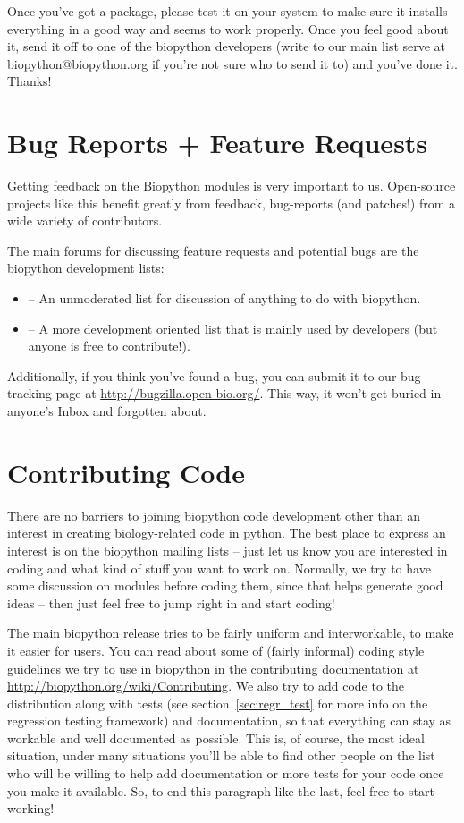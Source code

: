 \documentclass{report}
\begin{document}
Once you've got a package, please test it on your system to make sure it installs everything in a good way and seems to work properly. Once you feel good about it, send it off to one of the biopython developers (write to our main list serve at biopython@biopython.org if you're not sure who to send it to) and you've done it. Thanks!

\section{Bug Reports + Feature Requests}

Getting feedback on the Biopython modules is very important to us. Open-source projects like this benefit greatly from feedback, bug-reports (and patches!) from a wide variety of contributors.

The main forums for discussing feature requests and potential bugs are the biopython development lists:

\begin{itemize}
  \item {} -- An unmoderated list for discussion of anything to do with biopython.

  \item {} -- A more development oriented list that is mainly used by developers (but anyone is free to contribute!).
\end{itemize}

Additionally, if you think you've found a bug, you can submit it to our
bug-tracking page at \url{http://bugzilla.open-bio.org/}. This
way, it won't get buried in anyone's Inbox and forgotten about.

\section{Contributing Code}

There are no barriers to joining biopython code development other than an interest in creating biology-related code in python. The best place to express an interest is on the biopython mailing lists -- just let us know you are interested in coding and what kind of stuff you want to work on. Normally, we try to have some discussion on modules before coding them, since that helps generate good ideas -- then just feel free to jump right in and start coding!

The main biopython release tries to be fairly uniform and interworkable,
to make it easier for users. You can read about some of (fairly
informal) coding style guidelines we try to use in biopython in the
contributing documentation at
\url{http://biopython.org/wiki/Contributing}. We also try to add code to the distribution along with tests (see section~\ref{sec:regr_test} for more info on the regression testing framework) and documentation, so that everything can stay as workable and well documented as possible. This is, of course, the most ideal situation, under many situations you'll be able to find other people on the list who will be willing to help add documentation or more tests for your code once you make it available. So, to end this paragraph like the last, feel free to start working!
\end{document}
